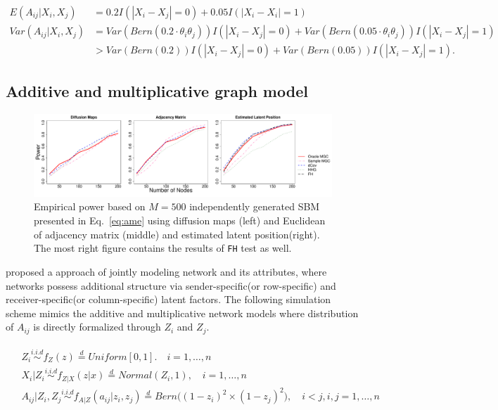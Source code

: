 \documentclass[12pt]{article}
\theoremstyle{definition}
\begin{document}
\begin{equation}
\begin{aligned}
E(A_{ij} | X_{i}, X_{j}) &  =  0.2 I(|X_{i} - X_{j}| = 0) + 0.05 I(|X_{i} - X_{i}| = 1) \\
Var(A_{ij} | X_{i}, X_{j}) & = Var( Bern(0.2 \cdot \theta_{i} \theta_{j})) I(|X_{i} - X_{j}| = 0) +
Var( Bern(0.05 \cdot \theta_{i} \theta_{j}) ) I( |X_{i} - X_{j}| = 1) \\
& > Var(Bern(0.2)) I(|X_{i} - X_{j}| = 0) + Var(Bern(0.05)) I(|X_{i} - X_{j}| = 1).
\end{aligned}
\label{eq:dcVariance}
\end{equation}	
	
	
\subsection{Additive and multiplicative graph model}

\begin{figure}[H]
	\centering
	\includegraphics[width=7in]{../Figure/ame.pdf}
	\caption{Empirical power based on $M = 500$ independently generated SBM presented in Eq.~\ref{eq:ame} using diffusion maps (left) and Euclidean of adjacency matrix (middle)  and estimated latent position(right). The most right figure contains the results of \texttt{FH} test as well.}
		\label{fig:ame}
\end{figure}

\cite{hoff2002latent} proposed a approach of jointly modeling network and its attributes, where networks possess additional structure via sender-specific(or row-specific) and receiver-specific(or column-specific) latent factors. The following simulation scheme mimics the additive and multiplicative network models where distribution of $A_{ij}$ is directly formalized through $Z_{i}$ and $Z_{j}$. 
	
\begin{equation}
\label{eq:ame}
\begin{gathered}
\begin{aligned}
&	Z_{i} \overset{i.i.d}{\sim} f_{Z}(z) \stackrel{d}{=} Uniform[0,1]. \quad i = 1, \ldots, n \\ 
&	X_{i} | Z_{i} \overset{i.i.d}{\sim}  f_{Z|X}(z|x) \stackrel{d}{=}  Normal(Z_{i}, 1), \quad i= 1, \ldots, n \\
&	A_{ij} | Z_{i}, Z_{j} \overset{i.i.d}{\sim}  f_{A|Z}(a_{ij} | z_{i}, z_{j}) \stackrel{d}{=}   Bern \big(  ( 1 - z_{i})^2 \times (1 - z_{j})^2    \big), \quad i < j, i,j = 1, \ldots, n
\end{aligned}
\end{gathered}
\end{equation}
\end{document}

